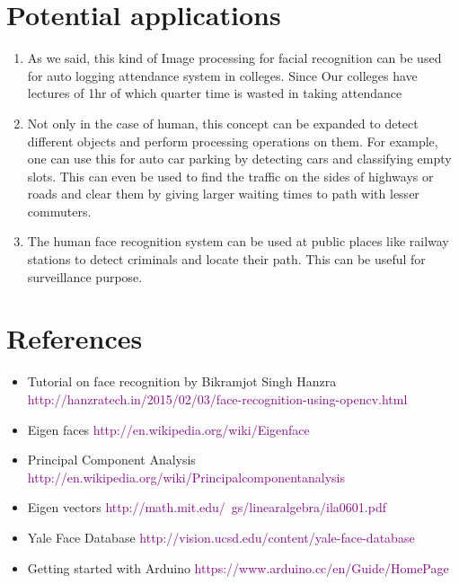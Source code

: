 \documentclass[a4paper,12pt]{article}
\begin{document}
\newpage
\section{Potential applications}
\begin{enumerate}
 \item As we said, this kind of Image processing for facial recognition can be used for auto logging attendance system in colleges. Since Our colleges have lectures of 1hr of which quarter time is wasted in taking attendance
 \item Not only in the case of human, this concept can be expanded to detect different objects and perform processing operations on them. For example, one can use this for auto car parking by detecting cars and classifying empty slots. This can even be used to find the traffic on the sides of highways or roads and clear them by giving larger waiting times to path with lesser commuters.
 \item The human face recognition system can be used at public places like railway stations to detect criminals and locate their path. This can be useful for surveillance  purpose.
\end{enumerate}

\newpage
\section{References}
\begin{itemize}
 \item Tutorial on face recognition by  Bikramjot Singh Hanzra
  \newline \textcolor{purple}{http://hanzratech.in/2015/02/03/face-recognition-using-opencv.html}
 \item Eigen faces
  \newline \textcolor{purple}{http://en.wikipedia.org/wiki/Eigenface}
 \item Principal Component Analysis
  \newline \textcolor{purple}{http://en.wikipedia.org/wiki/Principal\textunderscore component\textunderscore analysis}
 \item Eigen vectors
  \newline \textcolor{purple}{http://math.mit.edu/~gs/linearalgebra/ila0601.pdf}
 \item Yale Face Database
  \newline \textcolor{purple}{http://vision.ucsd.edu/content/yale-face-database}
 \item Getting started with Arduino
  \newline \textcolor{purple}{https://www.arduino.cc/en/Guide/HomePage}
\end{itemize}
\end{document}
